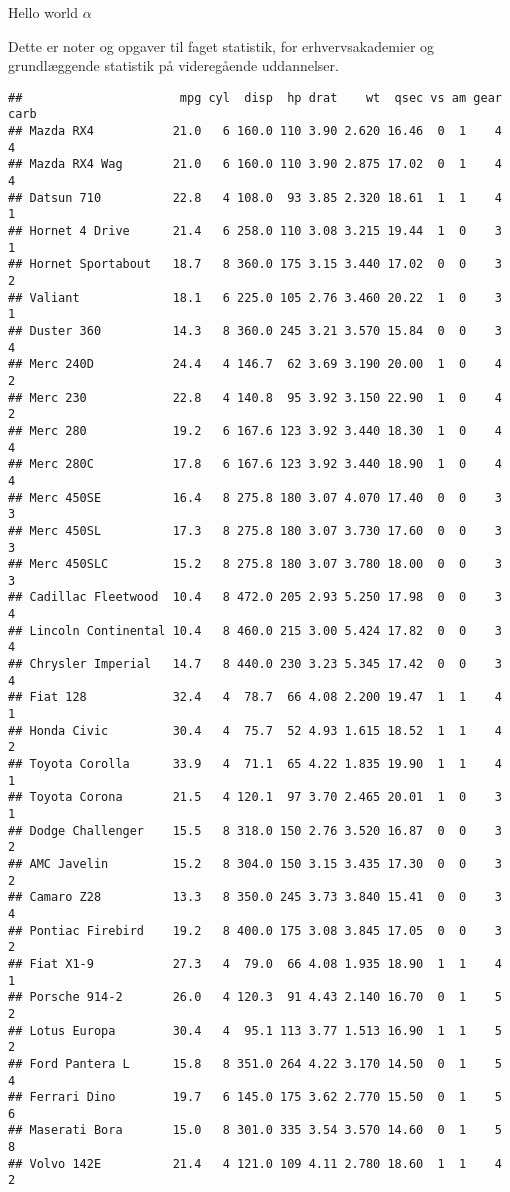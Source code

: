 \documentclass[]{book}
\theoremstyle{definition}
\theoremstyle{definition}
\theoremstyle{definition}
\theoremstyle{remark}
\begin{document}
\leavevmode\hypertarget{BlockName3}{}%
Hello world \(\alpha\)

Dette er noter og opgaver til faget statistik, for erhvervsakademier og
grundlæggende statistik på videregående uddannelser.

\begin{verbatim}
##                      mpg cyl  disp  hp drat    wt  qsec vs am gear carb
## Mazda RX4           21.0   6 160.0 110 3.90 2.620 16.46  0  1    4    4
## Mazda RX4 Wag       21.0   6 160.0 110 3.90 2.875 17.02  0  1    4    4
## Datsun 710          22.8   4 108.0  93 3.85 2.320 18.61  1  1    4    1
## Hornet 4 Drive      21.4   6 258.0 110 3.08 3.215 19.44  1  0    3    1
## Hornet Sportabout   18.7   8 360.0 175 3.15 3.440 17.02  0  0    3    2
## Valiant             18.1   6 225.0 105 2.76 3.460 20.22  1  0    3    1
## Duster 360          14.3   8 360.0 245 3.21 3.570 15.84  0  0    3    4
## Merc 240D           24.4   4 146.7  62 3.69 3.190 20.00  1  0    4    2
## Merc 230            22.8   4 140.8  95 3.92 3.150 22.90  1  0    4    2
## Merc 280            19.2   6 167.6 123 3.92 3.440 18.30  1  0    4    4
## Merc 280C           17.8   6 167.6 123 3.92 3.440 18.90  1  0    4    4
## Merc 450SE          16.4   8 275.8 180 3.07 4.070 17.40  0  0    3    3
## Merc 450SL          17.3   8 275.8 180 3.07 3.730 17.60  0  0    3    3
## Merc 450SLC         15.2   8 275.8 180 3.07 3.780 18.00  0  0    3    3
## Cadillac Fleetwood  10.4   8 472.0 205 2.93 5.250 17.98  0  0    3    4
## Lincoln Continental 10.4   8 460.0 215 3.00 5.424 17.82  0  0    3    4
## Chrysler Imperial   14.7   8 440.0 230 3.23 5.345 17.42  0  0    3    4
## Fiat 128            32.4   4  78.7  66 4.08 2.200 19.47  1  1    4    1
## Honda Civic         30.4   4  75.7  52 4.93 1.615 18.52  1  1    4    2
## Toyota Corolla      33.9   4  71.1  65 4.22 1.835 19.90  1  1    4    1
## Toyota Corona       21.5   4 120.1  97 3.70 2.465 20.01  1  0    3    1
## Dodge Challenger    15.5   8 318.0 150 2.76 3.520 16.87  0  0    3    2
## AMC Javelin         15.2   8 304.0 150 3.15 3.435 17.30  0  0    3    2
## Camaro Z28          13.3   8 350.0 245 3.73 3.840 15.41  0  0    3    4
## Pontiac Firebird    19.2   8 400.0 175 3.08 3.845 17.05  0  0    3    2
## Fiat X1-9           27.3   4  79.0  66 4.08 1.935 18.90  1  1    4    1
## Porsche 914-2       26.0   4 120.3  91 4.43 2.140 16.70  0  1    5    2
## Lotus Europa        30.4   4  95.1 113 3.77 1.513 16.90  1  1    5    2
## Ford Pantera L      15.8   8 351.0 264 4.22 3.170 14.50  0  1    5    4
## Ferrari Dino        19.7   6 145.0 175 3.62 2.770 15.50  0  1    5    6
## Maserati Bora       15.0   8 301.0 335 3.54 3.570 14.60  0  1    5    8
## Volvo 142E          21.4   4 121.0 109 4.11 2.780 18.60  1  1    4    2
\end{verbatim}
\end{document}
